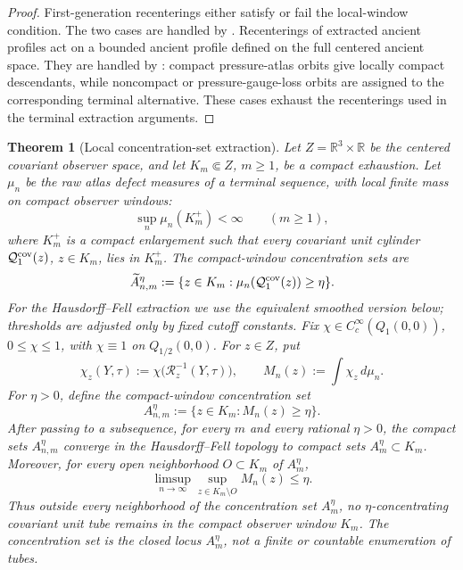 \documentclass[11pt]{amsart}
\numberwithin{equation}{section}
\theoremstyle{plain}
\newtheorem{theorem}{Theorem}[section]
\theoremstyle{definition}
\theoremstyle{remark}
\newcommand{\calR}{\mathcal R}
\begin{document}
\begin{proof}
First-generation recenterings either satisfy or fail the local-window condition.
The two cases are handled by
.
Recenterings of extracted ancient profiles act on a bounded ancient profile defined on the full
centered ancient space.  They are handled by
: compact pressure-atlas orbits
give locally compact descendants, while noncompact or pressure-gauge-loss
orbits are assigned to the corresponding terminal alternative.  These cases exhaust the
recenterings used in the terminal extraction arguments.
\end{proof}

\begin{theorem}[Local concentration-set extraction]
\label{thm:maximal-active-family}
Let \(Z=\mathbb R^3\times\mathbb R\) be the centered covariant observer space,
and let \(K_m\Subset Z\), \(m\ge1\), be a compact exhaustion.  Let
\(\mu_n\) be the raw atlas defect measures of a terminal sequence, with local finite
mass on compact observer windows:
\[
   \sup_n\mu_n(K_m^+)<\infty
   \qquad(m\ge1),
\]
where \(K_m^+\) is a compact enlargement such that every covariant unit
cylinder \(\mathcal Q_1^{\rm cov}(z)\), \(z\in K_m\), lies in \(K_m^+\).
The compact-window concentration sets are
\[
   \widetilde A_{n,m}^{\eta}
   :=
   \{z\in K_m:\mu_n(\mathcal Q_1^{\rm cov}(z))\ge\eta\}.
\]
For the Hausdorff--Fell extraction we use the equivalent smoothed version below;
thresholds are adjusted only by fixed cutoff constants.  Fix
\(\chi\in C_c^\infty(Q_1(0,0))\), \(0\le\chi\le1\), with
\(\chi\equiv1\) on \(Q_{1/2}(0,0)\).  For \(z\in Z\), put
\[
   \chi_z(Y,\tau)
   :=
   \chi\bigl(\calR_z^{-1}(Y,\tau)\bigr),
   \qquad
   M_n(z):=\int \chi_z\,d\mu_n .
\]
For \(\eta>0\), define the compact-window concentration set
\[
   A_{n,m}^{\eta}
   :=
   \{z\in K_m:M_n(z)\ge\eta\}.
\]
After passing to a subsequence, for every \(m\) and every rational
\(\eta>0\), the compact sets \(A_{n,m}^{\eta}\) converge in the
Hausdorff--Fell topology to compact sets \(A_m^\eta\subset K_m\).  Moreover,
for every open neighborhood \(O\subset K_m\) of \(A_m^\eta\),
\[
   \limsup_{n\to\infty}
   \sup_{z\in K_m\setminus O}M_n(z)
   \le \eta .
\]
Thus outside every neighborhood of the concentration set \(A_m^\eta\), no
\(\eta\)-concentrating covariant unit tube remains in the compact observer window
\(K_m\).  The concentration set is the closed locus \(A_m^\eta\), not a finite or
countable enumeration of tubes.
\end{theorem}
\end{document}
